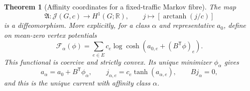 \documentclass[11pt]{article}
\newtheorem{theorem}{Theorem}[section]
\theoremstyle{definition}
\theoremstyle{remark}
\theoremstyle{definition}
\theoremstyle{remark}
\newcommand{\R}{\mathbb R}
\begin{document}
\begin{theorem}[Affinity coordinates for a fixed-traffic Markov fibre]
\label{thm:supp-nonlinear-Hodge}
The map
\begin{equation}
 \mathfrak A:\mathcal J(G,c)\longrightarrow H^1(G;\R),
 \qquad
 j\longmapsto[\operatorname{arctanh}(j/c)]
 \label{eq:supp-affinity-map}
\end{equation}
is a diffeomorphism.  More explicitly, for a class $\alpha$ and representative
$a_0$, define on mean-zero vertex potentials
\begin{equation}
 \mathcal F_\alpha(\phi)
 =\sum_{e\in E}c_e
  \log\cosh(a_{0,e}+(B^{\mathsf T}\phi)_e).
 \label{eq:supp-convex-affinity-functional}
\end{equation}
This functional is coercive and strictly convex.  Its unique minimizer
$\phi_\alpha$ gives
\begin{equation}
 a_\alpha=a_0+B^{\mathsf T}\phi_\alpha,
 \qquad
 j_{\alpha,e}=c_e\tanh(a_{\alpha,e}),
 \qquad Bj_\alpha=0,
 \label{eq:supp-affinity-inverse}
\end{equation}
and this is the unique current with affinity class $\alpha$.
\end{theorem}
\end{document}
